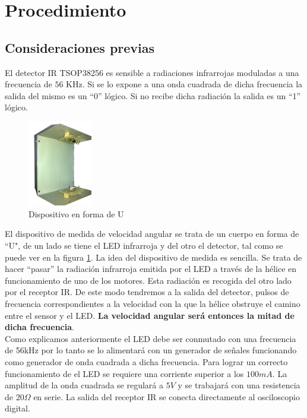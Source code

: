 \documentclass[main]{subfiles}
\begin{document}
\section{Procedimiento}


\subsection{Consideraciones previas}

El detector IR TSOP38256 es sensible a radiaciones infrarrojas moduladas a una frecuencia de $56$ KHz. Si se lo expone a una onda cuadrada de dicha frecuencia la salida del mismo es un ``0'' l\'ogico. Si no recibe dicha radiaci\'on la salida es un ``1'' l\'ogico.\\
\begin{figure}
  \begin{center}
    \includegraphics[width=0.25\textwidth]{./pics_motores/u.jpg}
  \end{center}
  \caption{Dispositivo en forma de U}
  \label{fig:u}
\end{figure}
El dispositivo de medida de velocidad angular se trata de un cuerpo en forma de ``U", de un lado se tiene el LED infrarroja y del otro el detector, tal como se puede ver en la figura \ref{fig:u}.
La idea del dispositivo de medida es sencilla. Se trata de hacer ``pasar'' la radiaci\'on infrarroja emitida por el LED a trav\'es de la h\'elice en funcionamiento de uno de los motores. Esta radiaci\'on es recogida del otro lado por el receptor IR. De este modo tendremos a la salida del detector, pulsos de frecuencia correspondientes a la velocidad con la que la h\'elice obstruye el camino entre el sensor y el LED. \textbf{La velocidad angular ser\'a entonces la mitad de dicha frecuencia}.\\

Como explicamos anteriormente el LED debe ser conmutado con una frecuencia de 56kHz por lo tanto se lo alimentar\'a con un generador de se\~nales funcionando como generador de onda cuadrada a dicha frecuencia. Para lograr un correcto funcionamiento de el LED se requiere una corriente superior a los $100mA$. La amplitud de la onda cuadrada se regular\'a a $5V$ y se trabajar\'a con una resistencia de $20\Omega$ en serie. La salida del receptor IR se conecta directamente al osciloscopio digital.\\
\end{document}

